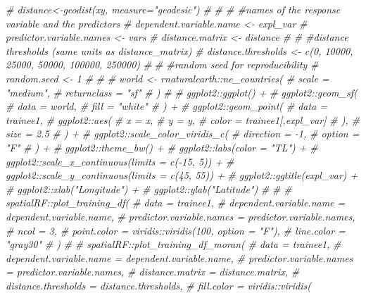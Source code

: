\documentclass[
]{article}
\newenvironment{Shaded}{\begin{snugshade}}{\end{snugshade}}
\newcommand{\CommentTok}[1]{\textcolor[rgb]{0.56,0.35,0.01}{\textit{#1}}}
\begin{document}
\begin{Shaded}
\begin{Highlighting}[]
\CommentTok{\# distance\textless{}{-}geodist(xy, measure="geodesic")}
\CommentTok{\# }
\CommentTok{\# \# \#names of the response variable and the predictors}
\CommentTok{\# dependent.variable.name \textless{}{-} expl\_var}
\CommentTok{\# predictor.variable.names \textless{}{-} vars}
\CommentTok{\# distance.matrix \textless{}{-} distance}
\CommentTok{\# }
\CommentTok{\# \#distance thresholds (same units as distance\_matrix)}
\CommentTok{\# distance.thresholds \textless{}{-} c(0, 10000, 25000, 50000, 100000, 250000)}
\CommentTok{\# }
\CommentTok{\# \#random seed for reproducibility}
\CommentTok{\# random.seed \textless{}{-} 1}
\CommentTok{\# }
\CommentTok{\# }
\CommentTok{\# world \textless{}{-} rnaturalearth::ne\_countries(}
\CommentTok{\#   scale = "medium", }
\CommentTok{\#   returnclass = "sf"}
\CommentTok{\# )}
\CommentTok{\# }
\CommentTok{\# ggplot2::ggplot() +}
\CommentTok{\#   ggplot2::geom\_sf(}
\CommentTok{\#     data = world, }
\CommentTok{\#     fill = "white"}
\CommentTok{\#   ) +}
\CommentTok{\#   ggplot2::geom\_point(}
\CommentTok{\#     data = trainee1,}
\CommentTok{\#     ggplot2::aes(}
\CommentTok{\#       x = x,}
\CommentTok{\#       y = y,}
\CommentTok{\#       color = trainee1[,expl\_var]}
\CommentTok{\#     ),}
\CommentTok{\#     size = 2.5}
\CommentTok{\#   ) +}
\CommentTok{\#   ggplot2::scale\_color\_viridis\_c(}
\CommentTok{\#     direction = {-}1, }
\CommentTok{\#     option = "F"}
\CommentTok{\#   ) +}
\CommentTok{\#   ggplot2::theme\_bw() +}
\CommentTok{\#   ggplot2::labs(color = "TL") +}
\CommentTok{\#   ggplot2::scale\_x\_continuous(limits = c({-}15, 5)) +}
\CommentTok{\#   ggplot2::scale\_y\_continuous(limits = c(45, 55))  +}
\CommentTok{\#   ggplot2::ggtitle(expl\_var) + }
\CommentTok{\#   ggplot2::xlab("Longitude") + }
\CommentTok{\#   ggplot2::ylab("Latitude")}
\CommentTok{\# }
\CommentTok{\# }
\CommentTok{\# spatialRF::plot\_training\_df(}
\CommentTok{\#   data = trainee1,}
\CommentTok{\#   dependent.variable.name = dependent.variable.name,}
\CommentTok{\#   predictor.variable.names = predictor.variable.names,}
\CommentTok{\#   ncol = 3,}
\CommentTok{\#   point.color = viridis::viridis(100, option = "F"),}
\CommentTok{\#   line.color = "gray30"}
\CommentTok{\# )}
\CommentTok{\# }
\CommentTok{\# spatialRF::plot\_training\_df\_moran(}
\CommentTok{\#   data = trainee1,}
\CommentTok{\#   dependent.variable.name = dependent.variable.name,}
\CommentTok{\#   predictor.variable.names = predictor.variable.names,}
\CommentTok{\#   distance.matrix = distance.matrix,}
\CommentTok{\#   distance.thresholds = distance.thresholds,}
\CommentTok{\#   fill.color = viridis::viridis(}

\end{Highlighting}
\end{Shaded}
\end{document}

